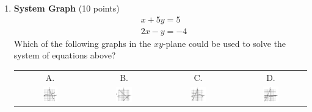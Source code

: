 \begin{enumerate}
  \item \textbf{System Graph} (10 points)\\
  \[\begin{aligned}
  & x+5y=5 \\
  & 2x-y=-4
  \end{aligned}\]
  Which of the following graphs in the $xy$-plane could be used to solve the system of equations above?\\
  \begin{center}
  \begin{tabular}{cccc}
  A. & B. & C. & D. \\
  \includegraphics[width=0.23\textwidth]{images/2025_06_15_7d5ca6a095740ea44a32g-15} &
  \includegraphics[width=0.23\textwidth]{images/2025_06_15_7d5ca6a095740ea44a32g-15(1)} &
  \includegraphics[width=0.23\textwidth]{images/2025_06_15_7d5ca6a095740ea44a32g-15(3)} &
  \includegraphics[width=0.23\textwidth]{images/2025_06_15_7d5ca6a095740ea44a32g-15(2)} \\
  \end{tabular}
  \end{center}
  \begin{subanswer}
  \end{subanswer}


\end{enumerate}
